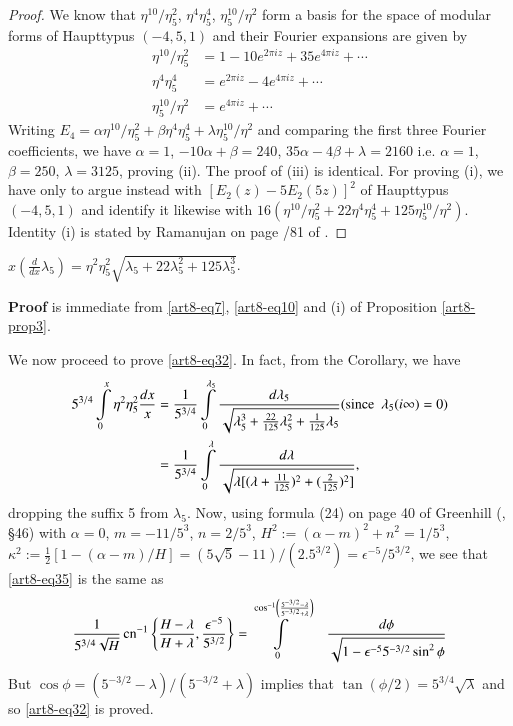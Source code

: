 \begin{proof}
We know that $\eta^{10}/\eta^{2}_{5}$, $\eta^{4}\eta^{4}_{5}$, $\eta^{10}_{5}/\eta^{2}$ form a basis for the space of modular forms of Haupttypus $(-4,5,1)$ and their Fourier expansions are given by
\begin{align*}
\eta^{10}/\eta^{2}_{5} &= 1-10e^{2\pi iz}+35 e^{4\pi iz}+\cdots\\
\eta^{4}\eta^{4}_{5} &= e^{2\pi iz}-4e^{4\pi iz}+\cdots\\
\eta^{10}_{5}/\eta^{2} &= e^{4\pi iz}+\cdots
\end{align*}\pageoriginale
Writing $E_{4}=\alpha \eta^{10}/\eta^{2}_{5}+\beta \eta^{4}\eta^{4}_{5}+\lambda \eta^{10}_{5}/\eta^{2}$ and comparing the first three Fourier coefficients, we have $\alpha=1$, $-10\alpha+\beta=240$, $35\alpha-4\beta+\lambda=2160$ i.e. $\alpha=1$, $\beta=250$, $\lambda=3125$, proving (ii). The proof of (iii) is identical. For proving (i), we have only to argue instead with $[E_{2}(z)-5E_{2}(5z)]^{2}$ of Haupttypus $(-4,5,1)$ and identify it likewise with $16(\eta^{10}/\eta^{2}_{5}+22\eta^{4}\eta^{4}_{5}+125\eta^{10}_{5}/\eta^{2})$. Identity (i) is stated by Ramanujan on page /81 of \cite{art8-key11}.
\end{proof}

\begin{coro*}
$x(\frac{d}{dx}\lambda_{5})=\eta^{2}\eta^{2}_{5}\sqrt{\lambda_{5}+22\lambda^{2}_{5}+125\lambda^{3}_{5}}$.
\end{coro*}

\noindent
{\bf Proof} is immediate from \eqref{art8-eq7}, \eqref{art8-eq10} and (i) of Proposition \ref{art8-prop3}.

We now proceed to prove \eqref{art8-eq32}. In fact, from the Corollary, we have
\begin{align}
5^{3/4}\int\limits^{x}_{0}\eta^{2}\eta^{2}_{5}\dfrac{dx}{x} &=\frac{1}{5^{3/4}}\int\limits^{\lambda_{5}}_{0}\dfrac{d\lambda_{5}}{\sqrt{\lambda^{3}_{5}+\frac{22}{125}\lambda^{2}_{5}+\frac{1}{125}\lambda_{5}}}(\text{since~ }\lambda_{5}(i\infty)=0)\notag\\
&= \frac{1}{5^{3/4}}\int\limits^{\lambda}_{0}\dfrac{d\lambda}{\sqrt{\lambda[(\lambda+\frac{11}{125})^{2}+(\frac{2}{125})^{2}]}},\label{art8-eq35}
\end{align}
dropping the suffix 5 from $\lambda_{5}$. Now, using formula (24) on page 40 of Greenhill (\cite{art8-key4}, \S46) with $\alpha=0$, $m=-11/5^{3}$, $n=2/5^{3}$, $H^{2}:=(\alpha-m)^{2}+n^{2}=1/5^{3}$, $\kappa^{2} := \frac{1}{2}[1-(\alpha-m)/H]=(5\sqrt{5}-11)/(2.5^{3/2})=\epsilon^{-5}/5^{3/2}$, we see that \eqref{art8-eq35} is the same as
$$
\frac{1}{5^{3/4}\sqrt{H}}\operatorname{cn}^{-1}\left\{\dfrac{H-\lambda}{H+\lambda},\dfrac{\epsilon^{-5}}{5^{3/2}}\right\}=\int\limits^{\cos^{-1}\left(\frac{5^{-3/2}-\lambda}{5^{-3/2}+\lambda}\right)}_{0}\quad \dfrac{d\phi}{\sqrt{1-\epsilon^{-5}5^{-3/2}\sin^{2}\phi}}
$$
But $\cos\phi=(5^{-3/2}-\lambda)/(5^{-3/2}+\lambda)$ implies that $\tan(\phi/2)=5^{3/4}\sqrt{\lambda}$ and so \eqref{art8-eq32} is proved.

